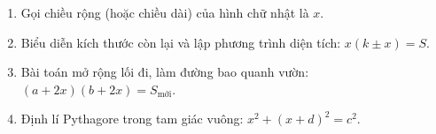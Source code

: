 \begin{enumerate}
\item Gọi chiều rộng (hoặc chiều dài) của hình chữ nhật là $x$.
\item Biểu diễn kích thước còn lại và lập phương trình diện tích: $x(k \pm x) = S$.
\item Bài toán mở rộng lối đi, làm đường bao quanh vườn: $(a + 2x)(b + 2x) = S_{\text{mới}}$.
\item Định lí Pythagore trong tam giác vuông: $x^2 + (x + d)^2 = c^2$.
\end{enumerate}
